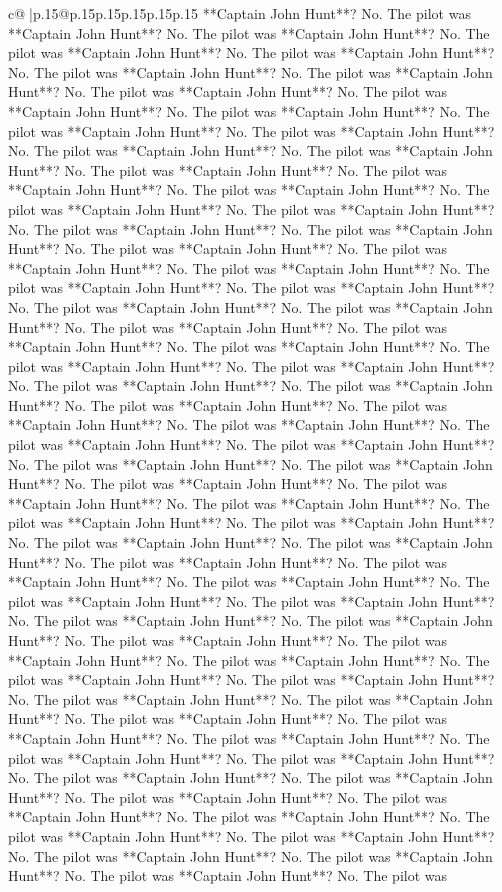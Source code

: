 \documentclass{article}
\begin{document}
{\begin{supertabular}{c@{$\;$}|p{.15\linewidth}@{}p{.15\linewidth}p{.15\linewidth}p{.15\linewidth}p{.15\linewidth}p{.15\linewidth}}
{{{**Captain John Hunt**? No. The pilot was **Captain John Hunt**? No. The pilot was **Captain John Hunt**? No. The pilot was **Captain John Hunt**? No. The pilot was **Captain John Hunt**? No. The pilot was **Captain John Hunt**? No. The pilot was **Captain John Hunt**? No. The pilot was **Captain John Hunt**? No. The pilot was **Captain John Hunt**? No. The pilot was **Captain John Hunt**? No. The pilot was **Captain John Hunt**? No. The pilot was **Captain John Hunt**? No. The pilot was **Captain John Hunt**? No. The pilot was **Captain John Hunt**? No. The pilot was **Captain John Hunt**? No. The pilot was **Captain John Hunt**? No. The pilot was **Captain John Hunt**? No. The pilot was **Captain John Hunt**? No. The pilot was **Captain John Hunt**? No. The pilot was **Captain John Hunt**? No. The pilot was **Captain John Hunt**? No. The pilot was **Captain John Hunt**? No. The pilot was **Captain John Hunt**? No. The pilot was **Captain John Hunt**? No. The pilot was **Captain John Hunt**? No. The pilot was **Captain John Hunt**? No. The pilot was **Captain John Hunt**? No. The pilot was **Captain John Hunt**? No. The pilot was **Captain John Hunt**? No. The pilot was **Captain John Hunt**? No. The pilot was **Captain John Hunt**? No. The pilot was **Captain John Hunt**? No. The pilot was **Captain John Hunt**? No. The pilot was **Captain John Hunt**? No. The pilot was **Captain John Hunt**? No. The pilot was **Captain John Hunt**? No. The pilot was **Captain John Hunt**? No. The pilot was **Captain John Hunt**? No. The pilot was **Captain John Hunt**? No. The pilot was **Captain John Hunt**? No. The pilot was **Captain John Hunt**? No. The pilot was **Captain John Hunt**? No. The pilot was **Captain John Hunt**? No. The pilot was **Captain John Hunt**? No. The pilot was **Captain John Hunt**? No. The pilot was **Captain John Hunt**? No. The pilot was **Captain John Hunt**? No. The pilot was **Captain John Hunt**? No. The pilot was **Captain John Hunt**? No. The pilot was **Captain John Hunt**? No. The pilot was **Captain John Hunt**? No. The pilot was **Captain John Hunt**? No. The pilot was **Captain John Hunt**? No. The pilot was **Captain John Hunt**? No. The pilot was **Captain John Hunt**? No. The pilot was **Captain John Hunt**? No. The pilot was **Captain John Hunt**? No. The pilot was **Captain John Hunt**? No. The pilot was **Captain John Hunt**? No. The pilot was **Captain John Hunt**? No. The pilot was **Captain John Hunt**? No. The pilot was **Captain John Hunt**? No. The pilot was **Captain John Hunt**? No. The pilot was **Captain John Hunt**? No. The pilot was **Captain John Hunt**? No. The pilot was **Captain John Hunt**? No. The pilot was **Captain John Hunt**? No. The pilot was **Captain John Hunt**? No. The pilot was **Captain John Hunt**? No. The pilot was **Captain John Hunt**? No. The pilot was **Captain John Hunt**? No. The pilot was **Captain John Hunt**? No. The pilot was **Captain John Hunt**? No. The pilot was **Captain John Hunt**? No. The pilot was **Captain John Hunt**? No. The pilot was **Captain John Hunt**? No. The pilot was **Captain John Hunt**? No. The pilot was **Captain John Hunt**? No. The pilot was }}}
\end{supertabular}}
\end{document}
